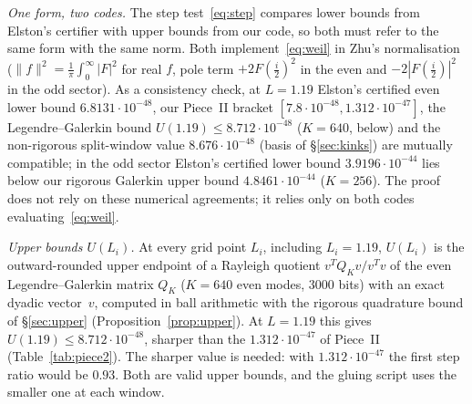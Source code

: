 \documentclass[11pt]{amsart}
\newcommand{\e}[1]{\cdot 10^{#1}}
\theoremstyle{definition}
\theoremstyle{remark}
\numberwithin{equation}{section}
\begin{document}
\emph{One form, two codes.} The step test~\eqref{eq:step} compares lower bounds from Elston's certifier with upper bounds from our code, so both must refer to the same form with the same norm. Both implement~\eqref{eq:weil} in Zhu's normalisation ($\|f\|^2=\frac1\pi\int_0^\infty|F|^2$ for real $f$, pole term $+2F(\tfrac i2)^2$ in the even and $-2|F(\tfrac i2)|^2$ in the odd sector). As a consistency check, at $L=1.19$ Elston's certified even lower bound $6.8131\e{-48}$, our Piece~II bracket $[7.8\e{-48},1.312\e{-47}]$, the Legendre--Galerkin bound $U(1.19)\le8.712\e{-48}$ ($K=640$, below) and the non-rigorous split-window value $8.676\e{-48}$ (basis of \S\ref{sec:kinks}) are mutually compatible; in the odd sector Elston's certified lower bound $3.9196\e{-44}$ lies below our rigorous Galerkin upper bound $4.8461\e{-44}$ ($K=256$). The proof does not rely on these numerical agreements; it relies only on both codes evaluating~\eqref{eq:weil}.

\emph{Upper bounds $U(L_i)$.} At every grid point $L_i$, including $L_i=1.19$, $U(L_i)$ is the outward-rounded upper endpoint of a Rayleigh quotient $v^TQ_Kv/v^Tv$ of the even Legendre--Galerkin matrix $Q_K$ ($K=640$ even modes, $3000$ bits) with an exact dyadic vector~$v$, computed in ball arithmetic with the rigorous quadrature bound of \S\ref{sec:upper} (Proposition~\ref{prop:upper}). At $L=1.19$ this gives $U(1.19)\le8.712\e{-48}$, sharper than the $1.312\e{-47}$ of Piece~II (Table~\ref{tab:piece2}). The sharper value is needed: with $1.312\e{-47}$ the first step ratio would be $0.93$. Both are valid upper bounds, and the gluing script uses the smaller one at each window.
\end{document}
